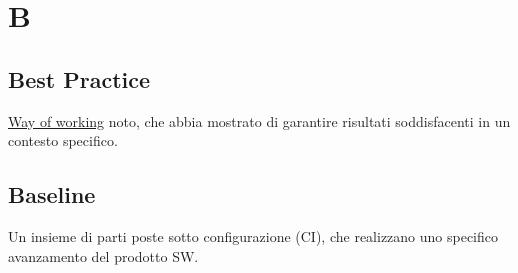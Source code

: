 \section{B}

    \subsection{Best Practice}
    \label{glossario:best-practice}
    \hyperref[glossario:wayofworking]{Way of working} noto, che abbia mostrato di garantire risultati soddisfacenti in un contesto specifico.

    \subsection{Baseline}
    \label{glossario:baseline}
    Un insieme di parti poste sotto configurazione (CI), che realizzano uno specifico avanzamento del prodotto SW.

\pagebreak